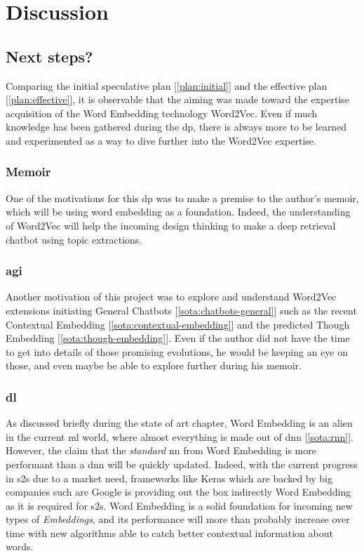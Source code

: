 \chapter{Discussion}
\label{chap:discussion}

\section{Next steps?}
Comparing the initial speculative plan [\ref{plan:initial}] and the effective plan [\ref{plan:effective}], it is observable that the aiming was made toward the expertise acquisition of the Word Embedding technology Word2Vec. Even if much knowledge has been gathered during the \gls{dp}, there is always more to be learned and experimented as a way to dive further into the Word2Vec expertise.

\subsection{Memoir}
One of the motivations for this \gls{dp} was to make a premise to the author's memoir, which will be using word embedding as a foundation. Indeed, the understanding of Word2Vec will help the incoming design thinking to make a deep retrieval chatbot using topic extractions.

\subsection{\gls{agi}}
Another motivation of this project was to explore and understand Word2Vec extensions initiating General Chatbots [\ref{sota:chatbots-general}] such as the recent Contextual Embedding [\ref{sota:contextual-embedding}] and the predicted Though Embedding [\ref{sota:though-embedding}]. Even if the author did not have the time to get into details of those promising evolutions, he would be keeping an eye on those, and even maybe be able to explore further during his memoir.

\subsection{\gls{dl}}
As discussed briefly during the state of art chapter, Word Embedding is an alien in the current \gls{ml} world, where almost everything is made out of \gls{dnn} [\ref{sota:rnn}]. However, the claim that the \textit{standard} {nn} from Word Embedding is more performant than a \gls{dnn} will be quickly updated. Indeed, with the current progress in \gls{s2s} due to a market need, frameworks like Keras which are backed by big companies such are Google is providing out the box indirectly Word Embedding as it is required for \gls{s2s}. Word Embedding is a solid foundation for incoming new types of \textit{Embeddings}, and its performance will more than probably increase over time with new algorithms able to catch better contextual information about words.

